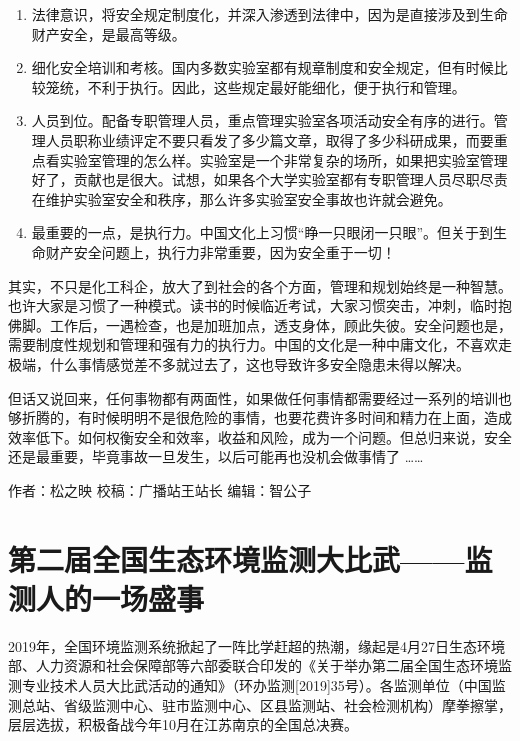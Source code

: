 \documentclass[
]{book}
\begin{document}
\begin{enumerate}
\def\labelenumi{\arabic{enumi}.}
\item
  法律意识，将安全规定制度化，并深入渗透到法律中，因为是直接涉及到生命财产安全，是最高等级。
\item
  细化安全培训和考核。国内多数实验室都有规章制度和安全规定，但有时候比较笼统，不利于执行。因此，这些规定最好能细化，便于执行和管理。
\item
  人员到位。配备专职管理人员，重点管理实验室各项活动安全有序的进行。管理人员职称业绩评定不要只看发了多少篇文章，取得了多少科研成果，而要重点看实验室管理的怎么样。实验室是一个非常复杂的场所，如果把实验室管理好了，贡献也是很大。试想，如果各个大学实验室都有专职管理人员尽职尽责在维护实验室安全和秩序，那么许多实验室安全事故也许就会避免。
\item
  最重要的一点，是执行力。中国文化上习惯``睁一只眼闭一只眼''。但关于到生命财产安全问题上，执行力非常重要，因为安全重于一切！
\end{enumerate}

其实，不只是化工科企，放大了到社会的各个方面，管理和规划始终是一种智慧。也许大家是习惯了一种模式。读书的时候临近考试，大家习惯突击，冲刺，临时抱佛脚。工作后，一遇检查，也是加班加点，透支身体，顾此失彼。安全问题也是，需要制度性规划和管理和强有力的执行力。中国的文化是一种中庸文化，不喜欢走极端，什么事情感觉差不多就过去了，这也导致许多安全隐患未得以解决。

但话又说回来，任何事物都有两面性，如果做任何事情都需要经过一系列的培训也够折腾的，有时候明明不是很危险的事情，也要花费许多时间和精力在上面，造成效率低下。如何权衡安全和效率，收益和风险，成为一个问题。但总归来说，安全还是最重要，毕竟事故一旦发生，以后可能再也没机会做事情了 \ldots\ldots{}

作者：松之映
校稿：广播站王站长
编辑：智公子

\hypertarget{ux7b2cux4e8cux5c4aux5168ux56fdux751fux6001ux73afux5883ux76d1ux6d4bux5927ux6bd4ux6b66ux76d1ux6d4bux4ebaux7684ux4e00ux573aux76dbux4e8b}{%
\section{第二届全国生态环境监测大比武------监测人的一场盛事}\label{ux7b2cux4e8cux5c4aux5168ux56fdux751fux6001ux73afux5883ux76d1ux6d4bux5927ux6bd4ux6b66ux76d1ux6d4bux4ebaux7684ux4e00ux573aux76dbux4e8b}}

2019年，全国环境监测系统掀起了一阵比学赶超的热潮，缘起是4月27日生态环境部、人力资源和社会保障部等六部委联合印发的《关于举办第二届全国生态环境监测专业技术人员大比武活动的通知》（环办监测{[}2019{]}35号）。各监测单位（中国监测总站、省级监测中心、驻市监测中心、区县监测站、社会检测机构）摩拳擦掌，层层选拔，积极备战今年10月在江苏南京的全国总决赛。
\end{document}
